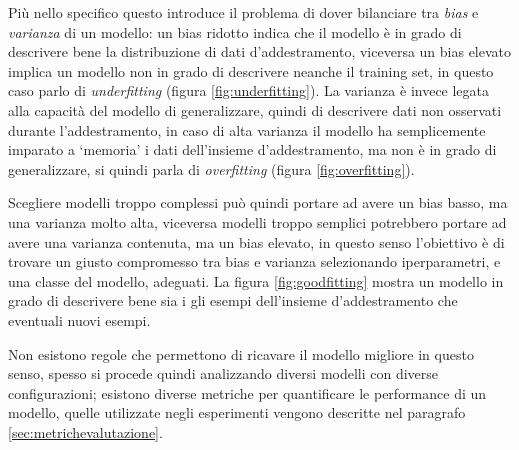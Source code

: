 \documentclass[../../main.tex]{subfiles}
\begin{document}
Più nello specifico questo introduce il problema di dover bilanciare tra \textit{bias} e \textit{varianza} di un modello: un bias ridotto indica che il modello è in grado di descrivere bene la distribuzione di dati d'addestramento, viceversa un bias elevato implica un modello non in grado di descrivere neanche il training set, in questo caso parlo di \textit{underfitting} (figura \ref{fig:underfitting}). La varianza è invece legata alla capacità del modello di generalizzare, quindi di descrivere dati non osservati durante l'addestramento, in caso di alta varianza il modello ha semplicemente imparato a `memoria' i dati dell'insieme d'addestramento, ma non è in grado di generalizzare, si quindi parla di \textit{overfitting} (figura \ref{fig:overfitting}).

Scegliere modelli troppo complessi può quindi portare ad avere un bias basso, ma una varianza molto alta, viceversa modelli troppo semplici potrebbero portare ad avere una varianza contenuta, ma un bias elevato, in questo senso l'obiettivo è di trovare un giusto compromesso tra bias e varianza selezionando iperparametri, e una classe del modello, adeguati. La figura \ref{fig:goodfitting} mostra un modello in grado di descrivere bene sia i gli esempi dell'insieme d'addestramento che eventuali nuovi esempi.

Non esistono regole che permettono di ricavare il modello migliore in questo senso, spesso si procede quindi analizzando diversi modelli con diverse configurazioni; esistono diverse metriche per quantificare le performance di un modello, quelle utilizzate negli esperimenti vengono descritte nel paragrafo \ref{sec:metrichevalutazione}.
\end{document}
